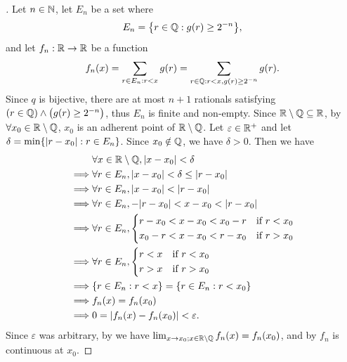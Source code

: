 \begin{proof}[]
  Let \(n \in \mathbb{N}\), let \(E_n\) be a set where
  \[
    E_n = \set{r \in \Q : g(r) \geq 2^{-n}},
  \]
  and let \(f_n : \mathbb{R} \to \mathbb{R}\) be a function
  \[
    f_n(x) = \sum_{r \in E_n : r < x} g(r) = \sum_{r \in \mathbb{Q} : r < x, g(r) \geq 2^{-n}} g(r).
  \]
  Since \(q\) is bijective, there are at most \(n + 1\) rationals satisfying \((r \in \mathbb{Q}) \land \big(g(r) \geq 2^{-n}\big)\), thus \(E_n\) is finite and non-empty.
  Since \(\mathbb{R} \setminus \mathbb{Q} \subseteq \mathbb{R}\), by  \(\forall x_0 \in \mathbb{R} \setminus \mathbb{Q}\), \(x_0\) is an adherent point of \(\mathbb{R} \setminus \mathbb{Q}\).
  Let \(\varepsilon \in \mathbb{R}^+\) and let \(\delta = \min\set{\abs{r - x_0} : r \in E_n}\).
  Since \(x_0 \notin \mathbb{Q}\), we have \(\delta > 0\).
  Then we have
  \begin{align*}
             & \forall x \in \R \setminus \Q, \abs{x - x_0} < \delta               \\
    \implies & \forall r \in E_n, \abs{x - x_0} < \delta \leq \abs{r - x_0}        \\
    \implies & \forall r \in E_n, \abs{x - x_0} < \abs{r - x_0}                    \\
    \implies & \forall r \in E_n, -\abs{r - x_0} < x - x_0 < \abs{r - x_0}         \\
    \implies & \forall r \in E_n, \begin{dcases}
                                    r - x_0 < x - x_0 < x_0 - r & \text{if } r < x_0 \\
                                    x_0 - r < x - x_0 < r - x_0 & \text{if } r > x_0
                                  \end{dcases} \\
    \implies & \forall r \in E_n, \begin{dcases}
                                    r < x & \text{if } r < x_0 \\
                                    r > x & \text{if } r > x_0
                                  \end{dcases}                       \\
    \implies & \set{r \in E_n : r < x} = \set{r \in E_n : r < x_0}                 \\
    \implies & f_n(x) = f_n(x_0)                                                   \\
    \implies & 0 = \abs{f_n(x) - f_n(x_0)} < \varepsilon.
  \end{align*}
  Since \(\varepsilon\) was arbitrary, by  we have \(\lim_{x \to x_0 ; x \in \mathbb{R} \setminus \mathbb{Q}} f_n(x) = f_n(x_0)\), and by  \(f_n\) is continuous at \(x_0\).


\end{proof}

